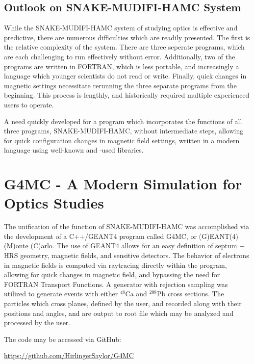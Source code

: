 \documentclass[11pt]{amsart}
\begin{document}
\subsection{Outlook on SNAKE-MUDIFI-HAMC System}

While the SNAKE-MUDIFI-HAMC system of studying optics is effective and predictive, there are numerous difficulties which are readily presented. The first is the relative complexity of the system. There are three seperate programs, which are each challenging to run effectively without error. Additionally, two of the programs are written in FORTRAN, which is less portable, and increasingly a language which younger scientists do not read or write. Finally, quick changes in magnetic settings necessitate rerunning the three separate programs from the beginning. This process is lengthly, and historically required multiple experienced users to operate.

A need quickly developed for a program which incorporates the functions of all three programs, SNAKE-MUDIFI-HAMC, without intermediate steps, allowing for quick configuration changes in magnetic field settings, written in a modern language using well-known and -used libraries.

\newpage
\section{G4MC - A Modern Simulation for Optics Studies}

The unification of the function of SNAKE-MUDIFI-HAMC was accomplished via the development of a C++/GEANT4 program called G4MC, or (G)EANT(4) (M)onte (C)arlo. The use of GEANT4 allows for an easy definition of septum + HRS geometry, magnetic fields, and sensitive detectors. The behavior of electrons in magnetic fields is computed via raytracing directly within the program, allowing for quick changes in magnetic field, and bypassing the need for FORTRAN Transport Functions. A generator with rejection sampling was utilized to generate events with either ${}^{48}$Ca and ${}^{208}$Pb cross sections. The particles which cross planes, defined by the user, and recorded along with their positions and angles, and are output to root file which may be analyzed and processed by the user.

The code may be accessed via GitHub:

\url{https://github.com/HirlingerSaylor/G4MC}
\end{document}
